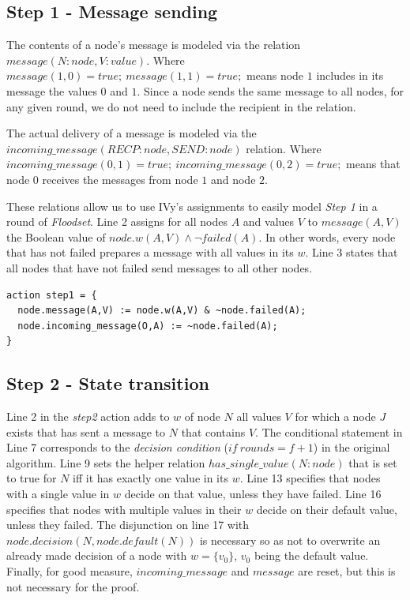 \documentclass[fleqn]{article}
\begin{document}
\subsection{Step 1 - Message sending}
The contents of a node's message is modeled via the relation $message(N:node,V:value)$. Where
$message(1,0) = true;\ message(1,1) = true;$ means node $1$ includes in its message the values $0$ and $1$.
Since a node sends the same message to all nodes, for any given round, we do not need to include the
recipient in the relation.

The actual delivery of a message is modeled via the $incoming\_message(RECP:node,SEND:node)$ relation. Where $incoming\_message(0,1) = true;\ incoming\_message(0,2) = true;$ means that node $0$ receives the messages from node $1$ and node $2$.

These relations allow us to use IVy's assignments to easily model \textit{Step 1} in a round of \textit{Floodset}.
Line 2 assigns for all nodes $A$ and values $V$ to $message(A,V)$ the Boolean value of $node.w(A,V) \land \neg failed(A)$. In other words, every node that has not failed prepares a message with all values in its $w$. Line 3 states that all nodes that have not failed send messages to all other nodes.

\begin{mdframed}[nobreak=true, backgroundcolor=light-gray, roundcorner=10pt,leftmargin=1, rightmargin=1, innerleftmargin=15, innertopmargin=15,innerbottommargin=15, outerlinewidth=1, linecolor=light-gray]
\begin{lstlisting}
action step1 = {
  node.message(A,V) := node.w(A,V) & ~node.failed(A);
  node.incoming_message(O,A) := ~node.failed(A);
}
\end{lstlisting}
\end{mdframed}

\subsection{Step 2 - State transition}

Line 2 in the \textit{step2} action adds to $w$ of node $N$ all values $V$ for which a node $J$ exists that has sent a message to $N$ that contains $V$.
The conditional statement in Line 7 corresponds to the \textit{decision condition} ($if\ rounds = f+1$) in the original algorithm. Line 9 sets the helper relation $has\_single\_value(N:node)$ that is set to true for $N$ iff it has exactly one value in its $w$. Line 13 specifies that nodes with a single value in $w$ decide on that value, unless they have failed. Line 16 specifies that nodes with multiple values in their $w$ decide on their default value, unless they failed. The disjunction on line 17 with $node . decision (N, node . default (N))$ is necessary so as not to overwrite an already made decision of a node with $w = \{v_0\}$, $v_0$ being the default value.
Finally, for good measure, $incoming\_message$ and $message$ are reset, but this is not necessary for the proof.
\end{document}
